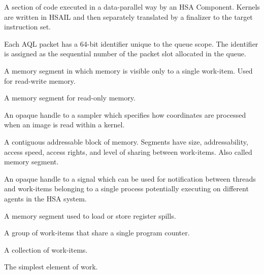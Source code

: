 \documentclass[final]{book}
\begin{document}
\begin{description}[itemsep=5pt,leftmargin=0cm, labelindent=0cm]
\item[Kernel] A section of code executed in a data-parallel way by an HSA
  Component. Kernels are written in HSAIL and then separately translated by a
  finalizer to the target instruction set.

\item[Packet ID] Each AQL packet has a 64-bit identifier unique to the queue
  scope. The identifier is assigned as the sequential number of the packet slot
  allocated in the queue.

\item[Private segment] A memory segment in which memory is visible only to a
  single work-item. Used for read-write memory.

\item[Readonly segment] A memory segment for read-only memory.

\item[Sampler handle] An opaque handle to a sampler which specifies how
  coordinates are processed when an image is read within a kernel.

\item[Segment] A contiguous addressable block of memory. Segments have size,
  addressability, access speed, access rights, and level of sharing between
  work-items. Also called memory segment.

\item[Signal (handle)] An opaque handle to a signal which can be used for
  notification between threads and work-items belonging to a single process
  potentially executing on different agents in the HSA system.

\item[Spill segment] A memory segment used to load or store register spills.

\item[Wavefront] A group of work-items that share a single program counter.

\item[Work-group] A collection of work-items.

\item[Work-item] The simplest element of work.

\end{description}

\newpage
{}
\printindex[api]
\printindex[ext]


\begin{thebibliography}{30}



\end{thebibliography}
\end{document}
